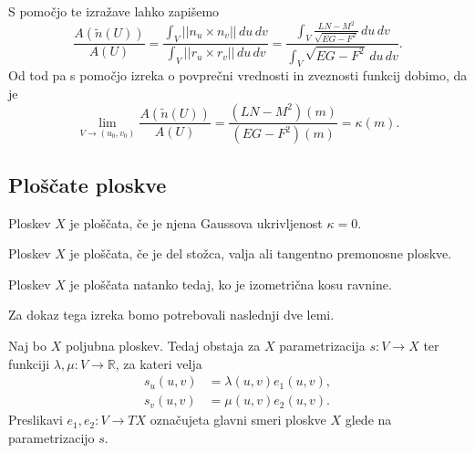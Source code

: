 S pomočjo te izražave lahko zapišemo \begin{equation*}
    \frac{A(\tilde{n}(U))}{A(U)} = \frac{\int_{V} \lvert\lvert n_u \times  n_v \rvert\rvert   \, du \, dv}{\int_{V} \lvert\lvert r_u \times  r_v \rvert\rvert   \, du \, dv} 
    = \frac{\int_{V} \frac{LN - M^2}{\sqrt{EG - F^2} }   \, du \, dv}{\int_{V} \sqrt{EG - F^2} \, du \, dv }.
    \end{equation*}  
Od tod pa s pomočjo izreka o povprečni vrednosti in zveznosti funkcij dobimo, da je \begin{equation*}
\lim_{V \to (u_0, v_0)} \frac{A(\tilde{n}(U))}{A(U)} = \frac{(LN - M^2)(m)}{(EG - F^2)(m)} = \kappa(m).
\end{equation*}  


\subsection{Ploščate ploskve}

\begin{definicija}
\label{def_ploscate_ploskve}
Ploskev $X$ je ploščata, če je njena Gaussova ukrivljenost $\kappa = 0$. 
\end{definicija}

\begin{izrek}
\label{izr_plsokev_je_ploscata_ce_je_del_valja_ali_tangentnopremosnosne_ploskve}
Ploskev $X$ je ploščata, če je del stožca, valja ali tangentno premonosne ploskve.
\end{izrek}

\begin{posledica}
\label{psl_plsokev_je_ploscata_iff_izometricna_kosu_ravnine}
Ploskev $X$ je ploščata natanko tedaj, ko je izometrična kosu ravnine.
\end{posledica}

Za dokaz tega izreka bomo potrebovali naslednji dve lemi.


\begin{lema}
\label{lem_obstoj_funkcij}
Naj bo $X$ poljubna ploskev. Tedaj obstaja za $X$ parametrizacija $s : V \to  X$ ter funkciji $\lambda, \mu : V \to  \mathbb{R}$, za kateri velja
\begin{align*}
  s_u(u,v) &= \lambda(u,v)e_1(u,v),  \\
  s_v(u,v) &= \mu(u,v)e_2(u,v).
\end{align*}
Preslikavi $e_1, e_2: V \to  TX$ označujeta glavni smeri ploskve $X$ glede na parametrizacijo $s$.
\end{lema}

